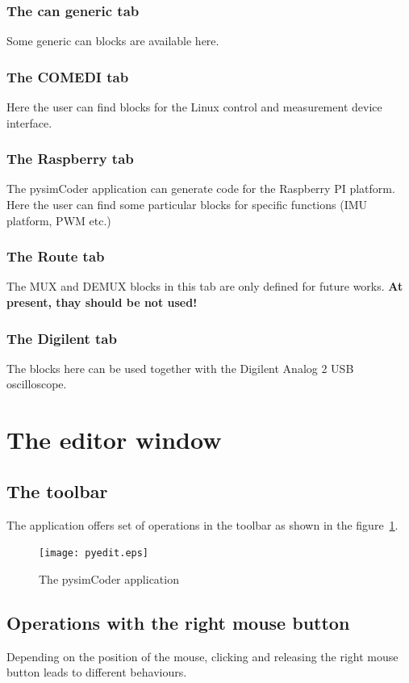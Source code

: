 \subsubsection{The can generic tab}
Some generic can blocks are available here.

\subsubsection{The COMEDI tab}
Here the user can find blocks for the Linux control and measurement device interface.

\subsubsection{The Raspberry tab}
The pysimCoder application can generate code for the Raspberry PI platform. Here the user can find some particular blocks for specific functions (IMU platform, PWM etc.)

\subsubsection{The Route tab}
The MUX and DEMUX blocks in this tab are only defined for future works. \textbf{At present, thay should be not used!}

\subsubsection{The Digilent tab}
The blocks here can be used together with the Digilent Analog 2 USB oscilloscope.

\section{The editor window}

\subsection{The toolbar}

The application offers  set of operations in the toolbar as shown in the 
figure~\ref{Fig:pysimCoder}.

\begin{figure}[htbp]
 \centering
 \texttt{[image: pyedit.eps]}
 \caption{The pysimCoder application}
 \label{Fig:pysimCoder}
 \end{figure}

\subsection{Operations with the right mouse button}
Depending on the position of the mouse, clicking and releasing the right mouse 
button leads to different behaviours.

